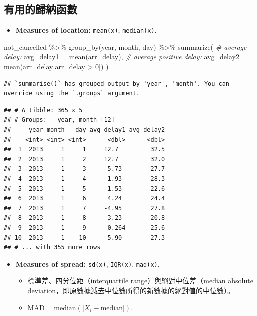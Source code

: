 \documentclass[
]{book}
\newenvironment{Shaded}{\begin{snugshade}}{\end{snugshade}}
\newcommand{\AttributeTok}[1]{\textcolor[rgb]{0.77,0.63,0.00}{#1}}
\newcommand{\CommentTok}[1]{\textcolor[rgb]{0.56,0.35,0.01}{\textit{#1}}}
\newcommand{\DecValTok}[1]{\textcolor[rgb]{0.00,0.00,0.81}{#1}}
\newcommand{\FunctionTok}[1]{\textcolor[rgb]{0.00,0.00,0.00}{#1}}
\newcommand{\NormalTok}[1]{#1}
\newcommand{\SpecialCharTok}[1]{\textcolor[rgb]{0.00,0.00,0.00}{#1}}
\providecommand{\tightlist}{%
  \setlength{\itemsep}{0pt}\setlength{\parskip}{0pt}}
\theoremstyle{definition}
\theoremstyle{remark}
\begin{document}
\hypertarget{ux6709ux7528ux7684ux6b78ux7d0dux51fdux6578}{%
\subsection{有用的歸納函數}\label{ux6709ux7528ux7684ux6b78ux7d0dux51fdux6578}}

\begin{itemize}
\tightlist
\item
  \textbf{Measures of location:} \texttt{mean(x)}, \texttt{median(x)}.
\end{itemize}

\begin{Shaded}
\begin{Highlighting}[]
\NormalTok{not\_cancelled }\SpecialCharTok{\%\textgreater{}\%}
  \FunctionTok{group\_by}\NormalTok{(year, month, day) }\SpecialCharTok{\%\textgreater{}\%}
  \FunctionTok{summarize}\NormalTok{(}
    \CommentTok{\# average delay:}
    \AttributeTok{avg\_delay1 =} \FunctionTok{mean}\NormalTok{(arr\_delay),}
    \CommentTok{\# average positive delay:}
    \AttributeTok{avg\_delay2 =} \FunctionTok{mean}\NormalTok{(arr\_delay[arr\_delay }\SpecialCharTok{\textgreater{}} \DecValTok{0}\NormalTok{])}
\NormalTok{)}
\end{Highlighting}
\end{Shaded}

\begin{verbatim}
## `summarise()` has grouped output by 'year', 'month'. You can override using the `.groups` argument.
\end{verbatim}

\begin{verbatim}
## # A tibble: 365 x 5
## # Groups:   year, month [12]
##     year month   day avg_delay1 avg_delay2
##    <int> <int> <int>      <dbl>      <dbl>
##  1  2013     1     1     12.7         32.5
##  2  2013     1     2     12.7         32.0
##  3  2013     1     3      5.73        27.7
##  4  2013     1     4     -1.93        28.3
##  5  2013     1     5     -1.53        22.6
##  6  2013     1     6      4.24        24.4
##  7  2013     1     7     -4.95        27.8
##  8  2013     1     8     -3.23        20.8
##  9  2013     1     9     -0.264       25.6
## 10  2013     1    10     -5.90        27.3
## # ... with 355 more rows
\end{verbatim}

\begin{itemize}
\item
  \textbf{Measures of spread:} \texttt{sd(x)}, \texttt{IQR(x)}, \texttt{mad(x)}.

  \begin{itemize}
  \tightlist
  \item
    標準差、四分位距（interquartile range）與絕對中位差（median absolute deviation，即原數據減去中位數所得的新數據的絕對值的中位數）。
  \item
    \(\mbox{MAD} = \mbox{median}(|X_i - \mbox{median}|)\).
  \end{itemize}
\end{itemize}
\end{document}
